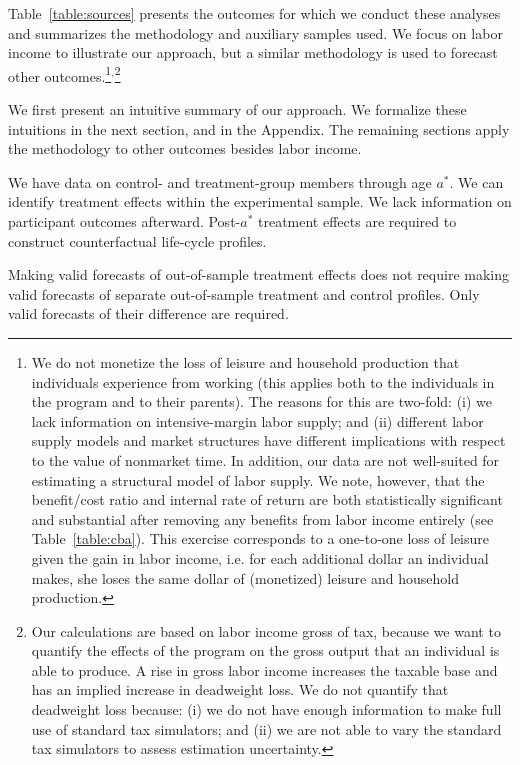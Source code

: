 Table~\ref{table:sources} presents the outcomes for which we conduct these analyses and summarizes the methodology and auxiliary samples used. We focus on labor income to illustrate our approach, but a similar methodology is used to forecast other outcomes.\footnote{We do not monetize the loss of leisure and household production that individuals experience from working (this applies both to the individuals in the program and to their parents). The reasons for this are two-fold: (i) we lack information on intensive-margin labor supply; and (ii) different labor supply models and market structures have different implications with respect to the value of nonmarket time. In addition, our data are not well-suited for estimating a structural model of labor supply. We note, however, that the benefit/cost ratio and internal rate of return are both statistically significant and substantial after removing any benefits from labor income entirely (see Table~\ref{table:cba}). This exercise corresponds to a one-to-one loss of leisure given the gain in labor income, i.e. for each additional dollar an individual makes, she loses the same dollar of (monetized) leisure and household production.}$^,$\footnote{Our calculations are based on labor income gross of tax, because we want to quantify the effects of the program on the gross output that an individual is able to produce. A rise in gross labor income increases the taxable base and has an implied increase in deadweight loss. We do not quantify that deadweight loss because: (i) we do not have enough information to make full use of standard tax simulators; and (ii) we are not able to vary the standard tax simulators to assess estimation uncertainty.}

We first present an intuitive summary of our approach. We formalize these intuitions in the next section, and in the Appendix. The remaining sections apply the methodology to other outcomes besides labor income.

We have data on control- and treatment-group members through age $a^{\ast}$. We can identify treatment effects within the experimental sample. We lack information on participant outcomes afterward. Post-$a^{\ast}$ treatment effects are required to construct counterfactual life-cycle profiles.

Making valid forecasts of out-of-sample treatment effects does not require making valid forecasts of separate out-of-sample treatment and control profiles. Only valid forecasts of their difference are required.

